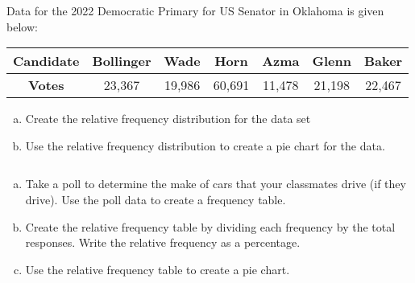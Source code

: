 \documentclass[notes]{subfiles}
\begin{document}
		\begin{ex}
			Data for the 2022 Democratic Primary for US Senator in Oklahoma is given below:
			\begin{center}
				{
				\renewcommand{\arraystretch}{1.3}
				\begin{tabular}{|c|c|c|c|c|c|c|}\hline
					\textbf{Candidate} & Bollinger & Wade & Horn & Azma & Glenn & Baker \\ \hline
					\textbf{Votes} & 23,367 & 19,986 & 60,691 & 11,478 & 21,198 & 22,467\\ \hline
				\end{tabular}
				}
			\end{center}
			\begin{enumerate}[(a)]
				\item Create the relative frequency distribution for the data set

				\item Use the relative frequency distribution to create a pie chart for the data.
			\end{enumerate}
		\end{ex}
			\newpage

		\begin{ex}
			$ $
			\begin{enumerate}[(a)]
				\item Take a poll to determine the make of cars that your classmates drive (if they drive).  Use the poll data to create a frequency table.
					\vs{1.5}

				\item Create the relative frequency table by dividing each frequency by the total responses.  Write the relative frequency as a percentage.
					\vs{1}

				\item Use the relative frequency table to create a pie chart.
					\vs{1}
			\end{enumerate}
		\end{ex}
			\newpage

\clearpage
\end{document}
